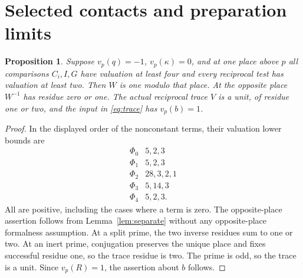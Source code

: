 \documentclass[11pt,a4paper]{article}
\newtheorem{proposition}[theorem]{Proposition}
\begin{document}
\section{Selected contacts and preparation limits}

\begin{proposition}\label{prop:selected}
Suppose $v_p(q)=-1$, $v_p(\kappa)=0$, and at one place above $p$
all comparisons $C_i,I,G$ have valuation at least four and every
reciprocal test has valuation at least two. Then $W$ is one modulo
that place. At the opposite place $W^{-1}$ has residue zero or one.
The actual reciprocal trace $V$ is a unit, of residue one or two,
and the input in \eqref{eq:trace} has $v_p(b)=1$.
\end{proposition}
\begin{proof}
In the displayed order of the nonconstant terms, their valuation
lower bounds are
\[
\begin{array}{c|c}
\Phi_0&5,2,3\\
\Phi_1&5,2,3\\
\Phi_2&28,3,2,1\\
\Phi_3&5,14,3\\
\Phi_4&5,2,3.
\end{array}
\]
All are positive, including the cases where a term is zero.
The opposite-place assertion follows from Lemma~\ref{lem:separate}
without any opposite-place formalness assumption. At a split prime,
the two inverse residues sum to one or two. At an inert prime,
conjugation preserves the unique place and fixes successful residue
one, so the trace residue is two. The prime is odd, so the trace
is a unit. Since $v_p(R)=1$, the assertion about $b$ follows.
\end{proof}
\end{document}
